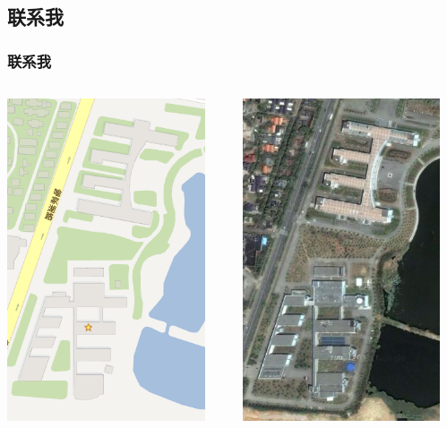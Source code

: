 \documentclass{beamer}
\begin{document}
\subsection{联系我}
\begin{frame}
	\frametitle{联系我}
	\begin{columns}
		\column{5cm}
			\centerline{\includegraphics[scale=0.3]{images/maps.google.com_2012-9-2_11_6_22.png}}\label{WNLO_location_map}
		\column{5cm}
			\centerline{\includegraphics[scale=0.3]{images/maps.google.com_2012-9-2_11_7_11.png}}\label{WNLO_location_sat}

\end{columns}
\end{frame}
\end{document}
